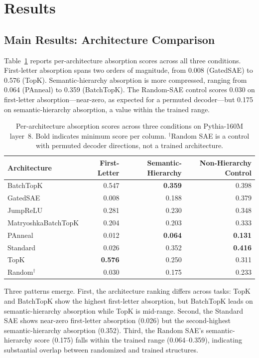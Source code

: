 \documentclass{article}
\begin{document}
\section{Results}

\subsection{Main Results: Architecture Comparison}

Table~\ref{tab:main} reports per-architecture absorption scores across all three conditions. First-letter absorption spans two orders of magnitude, from 0.008 (GatedSAE) to 0.576 (TopK). Semantic-hierarchy absorption is more compressed, ranging from 0.064 (PAnneal) to 0.359 (BatchTopK). The Random-SAE control scores 0.030 on first-letter absorption---near-zero, as expected for a permuted decoder---but 0.175 on semantic-hierarchy absorption, a value within the trained range.

\begin{table}[t]
\caption{Per-architecture absorption scores across three conditions on Pythia-160M layer~8. Bold indicates minimum score per column. $^\dagger$Random SAE is a control with permuted decoder directions, not a trained architecture.}
\label{tab:main}
\centering
\begin{tabular}{lrrr}
\toprule
Architecture & First-Letter & Semantic-Hierarchy & Non-Hierarchy Control \\
\midrule
BatchTopK & 0.547 & \textbf{0.359} & 0.398 \\
GatedSAE & 0.008 & 0.188 & 0.379 \\
JumpReLU & 0.281 & 0.230 & 0.348 \\
MatryoshkaBatchTopK & 0.204 & 0.203 & 0.333 \\
PAnneal & 0.012 & \textbf{0.064} & \textbf{0.131} \\
Standard & 0.026 & 0.352 & \textbf{0.416} \\
TopK & \textbf{0.576} & 0.250 & 0.311 \\
Random$^\dagger$ & 0.030 & 0.175 & 0.233 \\
\bottomrule
\end{tabular}
\end{table}

Three patterns emerge. First, the architecture ranking differs across tasks: TopK and BatchTopK show the highest first-letter absorption, but BatchTopK leads on semantic-hierarchy absorption while TopK is mid-range. Second, the Standard SAE shows near-zero first-letter absorption (0.026) but the second-highest semantic-hierarchy absorption (0.352). Third, the Random SAE's semantic-hierarchy score (0.175) falls within the trained range (0.064--0.359), indicating substantial overlap between randomized and trained structures.
\end{document}
